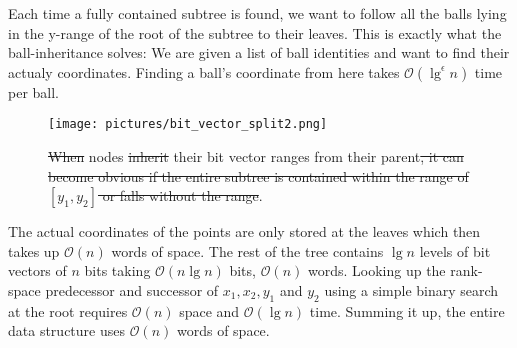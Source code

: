 \documentclass[twoside,11pt,openright]{report}
\providecommand{\DIFadd}[1]{{\protect\color{blue}\uwave{#1}}} %
\providecommand{\DIFdel}[1]{{\protect\color{red}\sout{#1}}}                      %
\providecommand{\DIFdelbegin}{} %
\providecommand{\DIFaddFL}[1]{\DIFadd{#1}} %
\providecommand{\DIFdelFL}[1]{\DIFdel{#1}} %
\providecommand{\DIFaddbeginFL}{} %
\providecommand{\DIFaddendFL}{} %
\providecommand{\DIFdelbeginFL}{} %
\providecommand{\DIFdelendFL}{} %
\begin{document}
Each time a fully contained subtree is found, we want to follow all the balls lying in the y-range of the root of the subtree to their leaves. This is exactly what the ball-inheritance solves: We are given a list of ball identities and want to find their actualy coordinates. Finding a ball's coordinate from here takes $\mathcal{O}(\lg^\epsilon n)$ time per ball.

\DIFdelbegin %
\DIFdelendFL \DIFaddbeginFL \begin{figure}[h]
    \DIFaddendFL \centering
    \DIFdelbeginFL %
\DIFdelendFL \DIFaddbeginFL \texttt{[image: pictures/bit\_vector\_split2.png]}
    \DIFaddendFL \caption{\DIFdelbeginFL \DIFdelFL{When }\DIFdelendFL \DIFaddbeginFL \DIFaddFL{Example of }\DIFaddendFL nodes \DIFdelbeginFL \DIFdelFL{inherit }\DIFdelendFL \DIFaddbeginFL \DIFaddFL{inheriting }\DIFaddendFL their bit vector ranges from their parent\DIFdelbeginFL \DIFdelFL{, it can become obvious if the entire subtree is contained within the range of $[y_1, y_2]$ or falls without the range}\DIFdelendFL .}
    \label{fig:bitvectorsplit}
\end{figure}



The actual coordinates of the points are only stored at the leaves which then takes up $\mathcal{O}(n)$  words of space. The rest of the tree contains $\lg n$ levels of bit vectors of $n$ bits taking $\mathcal{O}(n \lg n)$ bits, $\mathcal{O}(n)$ words. Looking up the rank-space predecessor and successor of $x_1, x_2, y_1$ and $y_2$ using a simple binary search at the root requires $\mathcal{O}(n)$ space and $\mathcal{O}(\lg n)$ time. Summing it up, the entire data structure uses $\mathcal{O}(n)$ words of space. 
\end{document}
